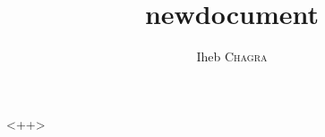 \documentclass[french,a4paper,11pt]{article}
\author{Iheb \textsc{Chagra}}
\title{newdocument}
\begin{document}
\maketitle
<++>
\end{document}
